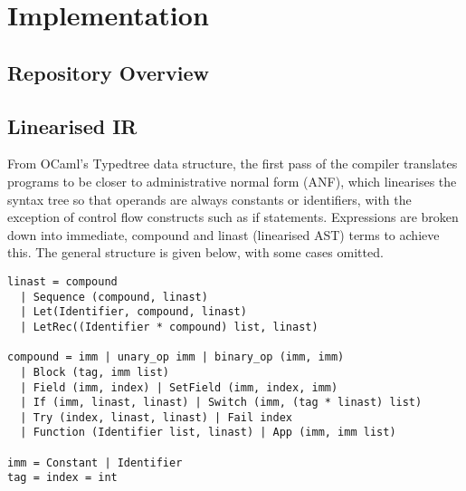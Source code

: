 \chapter{Implementation}

\section{Repository Overview}

\section{Linearised IR}
From OCaml's Typedtree data structure, the first pass of the compiler translates programs to be closer to administrative normal form (ANF), which linearises the syntax tree so that operands are always constants or identifiers, with the exception of control flow constructs such as if statements. Expressions are broken down into immediate, compound and linast (linearised AST) terms to achieve this. The general structure is given below, with some cases omitted.

\begin{verbatim}
linast = compound 
  | Sequence (compound, linast)
  | Let(Identifier, compound, linast) 
  | LetRec((Identifier * compound) list, linast)

compound = imm | unary_op imm | binary_op (imm, imm) 
  | Block (tag, imm list)
  | Field (imm, index) | SetField (imm, index, imm)
  | If (imm, linast, linast) | Switch (imm, (tag * linast) list)
  | Try (index, linast, linast) | Fail index
  | Function (Identifier list, linast) | App (imm, imm list)

imm = Constant | Identifier
tag = index = int
\end{verbatim}

